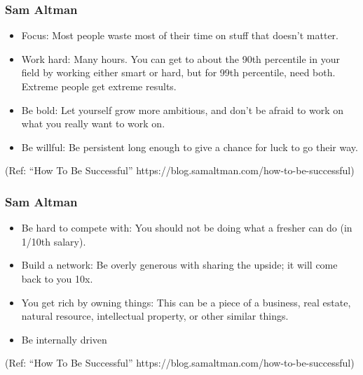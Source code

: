 \begin{frame}[fragile]\frametitle{Sam Altman}

\begin{itemize}
\item Focus: Most people waste most of their time on stuff that doesn’t matter.
\item Work hard: Many hours. You can get to about the 90th percentile in your field by working either smart or hard, but for 99th percentile, need both. Extreme people get extreme results.
\item Be bold: Let yourself grow more ambitious, and don’t be afraid to work on what you really want to work on.
\item Be willful: Be persistent long enough to give a chance for luck to go their way.
\end{itemize}

{\tiny (Ref: ``How To Be Successful'' https://blog.samaltman.com/how-to-be-successful)}
\end{frame}



\begin{frame}[fragile]\frametitle{Sam Altman}

\begin{itemize}
\item Be hard to compete with: You should not be doing what a fresher can do (in 1/10th salary). 
\item Build a network:  Be overly generous with sharing the upside; it will come back to you 10x. 
\item You get rich by owning things: This can be a piece of a business, real estate, natural resource, intellectual property, or other similar things.
\item Be internally driven
\end{itemize}

{\tiny (Ref: ``How To Be Successful'' https://blog.samaltman.com/how-to-be-successful)}
\end{frame}
